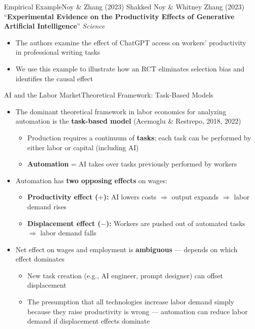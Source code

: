 \documentclass[hyperref={pdfpagelabels=false}]{beamer}
\begin{document}
	
\begin{frame}{Empirical Example}{Noy \& Zhang (2023)}
	Shakked Noy \& Whitney Zhang (2023) ``\textbf{Experimental Evidence on the Productivity Effects of Generative Artificial Intelligence}'' \textit{Science}
	\begin{itemize}
		\vspace{0.2cm}
		\item The authors examine the effect of ChatGPT access on workers' productivity in professional writing tasks
		\vspace{0.2cm}
		\item We use this example to illustrate how an RCT eliminates selection bias and identifies the causal effect
	\end{itemize}
\end{frame}



\begin{frame}{AI and the Labor Market}{Theoretical Framework: Task-Based Models}
	\begin{itemize}
		\item The dominant theoretical framework in labor economics for analyzing automation is the \textbf{task-based model} (Acemoglu \& Restrepo, 2018, 2022)
		\vspace{0.2cm}
		\begin{itemize}
			\item Production requires a continuum of \textbf{tasks}; each task can be performed by either labor or capital (including AI)
			\vspace{0.1cm}
			\item \textbf{Automation} = AI takes over tasks previously performed by workers
		\end{itemize}
		\vspace{0.3cm}
		\item Automation has \textbf{two opposing effects} on wages:
		\vspace{0.1cm}
		\begin{itemize}
			\item \textbf{Productivity effect ($+$):} AI lowers costs $\Rightarrow$ output expands $\Rightarrow$ labor demand rises
			\vspace{0.1cm}
			\item \textbf{Displacement effect ($-$):} Workers are pushed out of automated tasks $\Rightarrow$ labor demand falls
		\end{itemize}
		\vspace{0.3cm}
		\item Net effect on wages and employment is \textbf{ambiguous} --- depends on which effect dominates
		\vspace{0.1cm}
		\begin{itemize}
			\item New task creation (e.g., AI engineer, prompt designer) can offset displacement
			\item The presumption that all technologies increase labor demand simply because they raise productivity is wrong --- automation can reduce labor demand if displacement effects dominate 
		\end{itemize}
	\end{itemize}
\end{frame}
\end{document}
